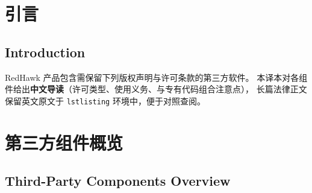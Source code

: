 \label{chap:lic}

\section{引言}
\subsection*{Introduction}

RedHawk 产品包含需保留下列版权声明与许可条款的第三方软件。
本译本对各组件给出\textbf{中文导读}（许可类型、使用义务、与专有代码组合注意点），
长篇法律正文保留英文原文于 \texttt{lstlisting} 环境中，便于对照查阅。

\section{第三方组件概览}
\subsection*{Third-Party Components Overview}

